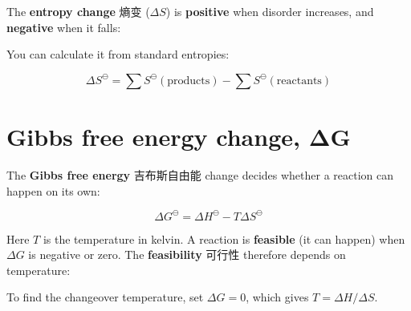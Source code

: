 \documentclass[11pt]{article}
\begin{document}
The \textbf{entropy change} 熵变 ($\Delta S$) is \textbf{positive} when disorder increases, and \textbf{negative} when it falls:

\begin{center}
\end{center}

You can calculate it from standard entropies:

\[
\Delta S^{\ominus} = \sum S^{\ominus}(\text{products}) - \sum S^{\ominus}(\text{reactants})
\]

\section*{Gibbs free energy change, ΔG}

The \textbf{Gibbs free energy} 吉布斯自由能 change decides whether a reaction can happen on its own:

\[
\Delta G^{\ominus} = \Delta H^{\ominus} - T\Delta S^{\ominus}
\]

Here $T$ is the temperature in kelvin. A reaction is \textbf{feasible} (it can happen) when $\Delta G$ is negative or zero. The \textbf{feasibility} 可行性 therefore depends on temperature:

\begin{center}
\end{center}

To find the changeover temperature, set $\Delta G = 0$, which gives $T = \Delta H / \Delta S$.
\end{document}
